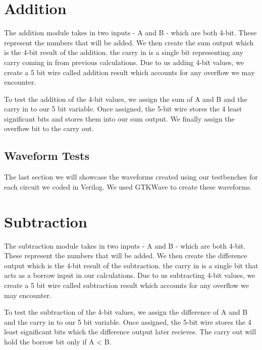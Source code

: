 \documentclass[12pt]{article}
\begin{document}
\section{Addition}
The addition module takes in two inputs - A and B - which are both 4-bit. These represent the numbers that will be added. We then create the sum output which is the 4-bit result of the addition. the carry in is a single bit representing any carry coming in from previous calculations. Due to us adding 4-bit values, we create a 5 bit wire called addition result which accounts for any overflow we may encounter. 


To test the addition of the 4-bit values, we assign the sum of A and B and the carry in to our 5 bit variable. Once assigned, the 5-bit wire stores the 4 least significant bits and stores them into our sum output. We finally assign the overflow bit to the carry out.








\subsection{Waveform Tests}

The last section we will showcase the waveforms created using our testbenches for each circuit we coded in Verilog. We used GTKWave to create these waveforms.






\section{Subtraction}
The subtraction module takes in two inputs - A and B - which are both 4-bit. These represent the numbers that will be added. We then create the difference output which is the 4-bit result of the subtraction. the carry in is a single bit that acts as a borrow input in our calculations. Due to us subtracting 4-bit values, we create a 5 bit wire called subtraction result which accounts for any overflow we may encounter. 


To test the subtraction of the 4-bit values, we assign the difference of A and B and the carry in to our 5 bit variable. Once assigned, the 5-bit wire stores the 4 least significant bits which the difference output later recieves. The carry out will hold the borrow bit only if A < B.

\end{document}
